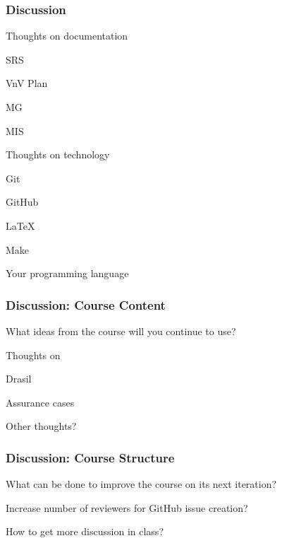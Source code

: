 \documentclass[t,12pt,numbers,fleqn]{beamer}
\begin{document}
\begin{frame}
\frametitle{Discussion}

\bi
\item Thoughts on documentation
\bi
\item SRS
\item VnV Plan
\item MG
\item MIS
\ei
\item Thoughts on technology
\bi
\item Git
\item GitHub
\item LaTeX
\item Make
\item Your programming language
\ei
\ei

\end{frame}


\begin{frame}
\frametitle{Discussion: Course Content}

\bi
\item What ideas from the course will you continue to use?
\item Thoughts on
\bi
\item Drasil
\item Assurance cases
\ei
\item Other thoughts?
\ei

\end{frame}


\begin{frame}
\frametitle{Discussion: Course Structure}

\bi
\item What can be done to improve the course on its next iteration?
\item Increase number of reviewers for GitHub issue creation?
\item How to get more discussion in class?
\ei

\end{frame}

\end{document}
